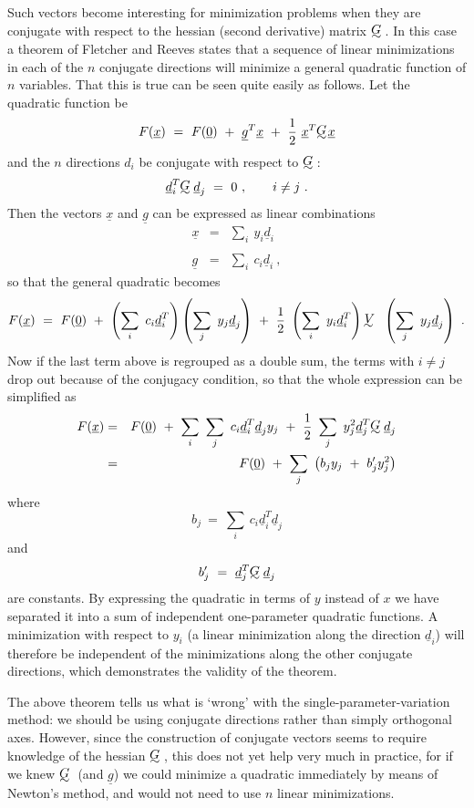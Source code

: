      Such vectors become interesting for minimization problems when they
are conjugate with respect to the hessian (second derivative) matrix $\UTG$.
In this case a theorem of Fletcher and Reeves \cite{Flet1} states that a sequence
of linear minimizations in each of the $n$ conjugate directions will
minimize a general quadratic function of $n$ variables.  That this is true
can be seen quite easily as follows.  Let the quadratic function be
 $$F({\underline{x}})~=~F({\underline{0}})~+~{\underline{g}}^T {\underline{x}}~+~{1\over 2}~
{\underline{x}}^T \UTG\!{\underline{x}}$$
 and the $n$ directions $d_i$ be conjugate with respect to $\UTG$:
             $${\underline{d}}_i^T\UTG{\underline{d}}_j~=~0~,\qquad i\neq j~.$$
Then the vectors ${\underline{x}}$ and ${\underline{g}}$ can be expressed as linear combinations
\begin{eqnarray}
{\underline{x}}&=&\sum_{i}~y_i{\underline{d}}_i\nonumber \\
\nonumber\\
{\underline{g}}&=&\sum_{i}~c_i{\underline{d}}_i~,\nonumber
\end{eqnarray}
so that the general quadratic becomes
 $$F({\underline{x}})~=~F({\underline{0}})~+~\left(\sum_i~c_i{\underline{d}}^T_i\right)
\left(\sum_j~ y_j{\underline{d}}_j\right)~+~{1\over 2}~\left(\sum_i~y_i{\underline{d}}^T_i\right)
\UTV~\left(\sum_j~ y_j{\underline{d}}_j\right)~.$$
 Now  if the last term above is regrouped as a double sum, the terms with
 $i\neq j$  drop out because of the conjugacy condition, so that the whole
expression can be simplified as
 \begin{eqnarray}
F({\underline{x}})&=&F({\underline{0}})~+~\sum_i~\sum_j~c_i{\underline{d}}^T_i
{\underline{d}}_j y_j~+~{1\over
2}~\sum_{j}~y^2_j{\underline{d}}^T_j\UTG{\underline{d}}_j\nonumber\\
&=&F({\underline{0}})~+~\sum_j~\left(b_j y_j~+~b^{\prime}_j y^{2}_j\right)\nonumber
\end{eqnarray}
where
 $$b_j~=~\sum_i~c_i{\underline{d}}^T_i{\underline{d}}_j$$
 and
 $$b^{\prime}_j~=~{\underline{d}}^T_j \UTG{\underline{d}}_j$$
 are constants. By expressing the quadratic in terms of $y$ instead of $x$
we have separated it into a sum of independent one-parameter quadratic
functions.  A minimization with respect to $y_i$ (a linear minimization
along the direction ${\underline{d}}_i$) will therefore be independent of the minimizations
along the other conjugate directions, which demonstrates the validity
of the theorem.
 
     The above theorem tells us what is `wrong' with the
single-parameter-va\-ria\-tion method:  we should
be using conjugate directions rather than
simply orthogonal axes.  However, since the construction of conjugate
vectors seems to require knowledge of the hessian $\UTG$, this does not yet
help very much in practice, for if we knew $\UTG$ (and ${\underline{g}}$) we could minimize
a quadratic immediately by means of Newton's method, and would not need
to use $n$ linear minimizations.
 
